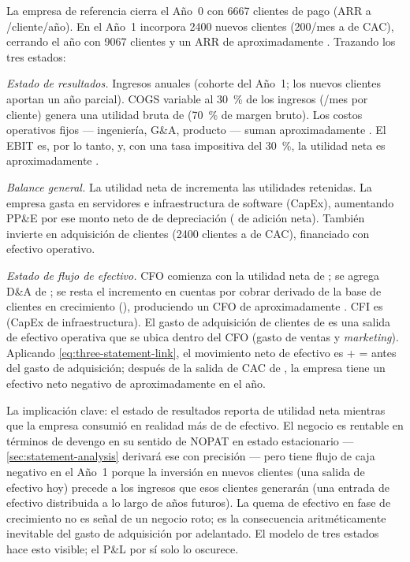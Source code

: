 \begin{example}
La empresa de referencia cierra el Año~0 con \num{6667} clientes de pago (ARR  a
/cliente/año). En el Año~1 incorpora \num{2400} nuevos clientes (\num{200}/mes a
 de CAC), cerrando el año con \num{9067} clientes y un ARR de aproximadamente
. Trazando los tres estados:

\medskip
\textit{Estado de resultados.} Ingresos anuales  (cohorte del Año~1; los nuevos
clientes aportan un año parcial). COGS variable al \qty{30}{\percent} de los ingresos
(/mes por cliente) genera una utilidad bruta de  (\qty{70}{\percent} de
margen bruto). Los costos operativos fijos --- ingeniería, G\&A, producto --- suman
aproximadamente . El EBIT es, por lo tanto,  y, con una tasa
impositiva del \qty{30}{\percent}, la utilidad neta es aproximadamente .

\medskip
\textit{Balance general.} La utilidad neta de  incrementa las utilidades retenidas.
La empresa gasta  en servidores e infraestructura de software (CapEx), aumentando
PP\&E por ese monto neto de  de depreciación ( de adición neta).
También invierte  en adquisición de clientes (\num{2400} clientes a 
de CAC), financiado con efectivo operativo.

\medskip
\textit{Estado de flujo de efectivo.} CFO comienza con la utilidad neta de ; se
agrega D\&A de ; se resta el incremento en cuentas por cobrar derivado de la
base de clientes en crecimiento (), produciendo un CFO de aproximadamente
. CFI es  (CapEx de infraestructura). El gasto de adquisición de
clientes de  es una salida de efectivo operativa que se ubica dentro del CFO
(gasto de ventas y \emph{marketing}). Aplicando \cref{eq:three-statement-link}, el movimiento
neto de efectivo es  +  =  antes del gasto de
adquisición; después de la salida de CAC de , la empresa tiene un efectivo neto
negativo de aproximadamente  en el año.

\medskip
La implicación clave: el estado de resultados reporta  de utilidad neta mientras que
la empresa consumió en realidad más de  de efectivo. El negocio es rentable en
términos de devengo en su sentido de NOPAT en estado estacionario --- \cref{sec:statement-analysis}
derivará ese  con precisión --- pero tiene flujo de caja negativo en el Año~1 porque
la inversión en nuevos clientes (una salida de efectivo hoy) precede a los ingresos que esos
clientes generarán (una entrada de efectivo distribuida a lo largo de años futuros). La quema de
efectivo en fase de crecimiento no es señal de un negocio roto; es la consecuencia aritméticamente
inevitable del gasto de adquisición por adelantado. El modelo de tres estados hace esto visible;
el P\&L por sí solo lo oscurece.
\end{example}

